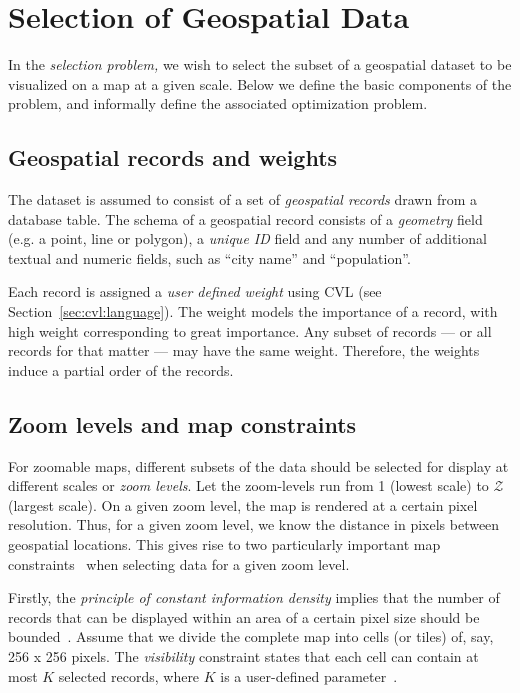 \documentclass[11pt, oneside]{report}
\begin{document}
\section{Selection of Geospatial Data}
\label{sec:cvl:background}

In the \emph{selection problem,} we wish to select the subset of a geospatial dataset to be visualized on a map at a given scale. Below we define the basic components of the problem, and informally define the associated optimization problem.

\subsection{Geospatial records and weights}
\label{sec:cvl:records}

The dataset is assumed to consist of a set of \emph{geospatial records} drawn from a database table. The schema of a geospatial record consists of a \emph{geometry} field (e.g. a point, line or polygon), a \emph{unique ID} field and any number of additional textual and numeric fields, such as ``city name'' and ``population''.

Each record is assigned a \emph{user defined weight} using CVL (see Section~\ref{sec:cvl:language}). The weight models the importance of a record, with high weight corresponding to great importance. Any subset of records --- or all records for that matter --- may have the same weight. Therefore, the weights induce a partial order of the records.

\subsection{Zoom levels and map constraints}
\label{sec:cvl:constraints}
For zoomable maps, different subsets of the data should be selected for display at different scales or \emph{zoom levels}. Let the zoom-levels run from 1 (lowest scale) to $\mathcal{Z}$ (largest scale). On a given zoom level, the map is rendered at a certain pixel resolution. Thus, for a given zoom level, we know the distance in pixels between geospatial locations. This gives rise to two particularly important map constraints~\cite{harrie2007modelling} when selecting data for a given zoom level.

Firstly, the \emph{principle of constant information density} implies that the number of records that can be displayed within an area of a certain pixel size should be bounded~\cite{topfer1966principles}. Assume that we divide the complete map into cells (or tiles) of, say, 256 x 256 pixels. The \emph{visibility} constraint states that each cell can contain at most $K$ selected records, where $K$ is a user-defined parameter~\cite{sarma2012fusiontables}.
\end{document}
